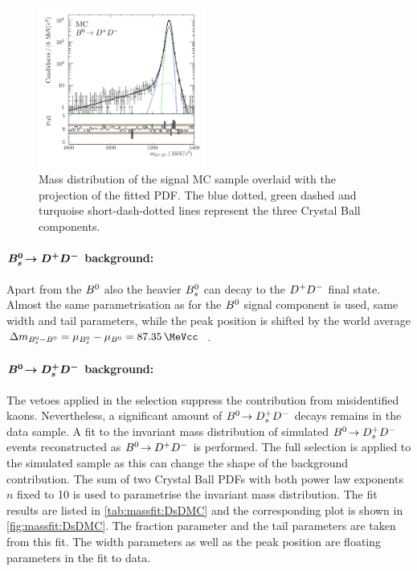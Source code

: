 \begin{figure}[tbh]
\centering
\includegraphics[width=0.49\textwidth]{07-B02DD/tikz/pdf/obsMass_MC.pdf}
\caption{Mass distribution of the \BdToDD signal MC sample overlaid with the
projection of the fitted PDF. The blue dotted, green dashed and turquoise
short-dash-dotted lines represent the three Crystal Ball components.}%
\label{fig:b02dd:massfit:mc}
\end{figure}

\paragraph{$\boldsymbol{{{B}^0_{s}}\!\rightarrow {\ensuremath{{D}^+}}{\ensuremath{{D}^-}}}$ background:}
Apart from the ${{B}^0}$ also the heavier ${{B}^0_{s}}$ can decay to the ${{D}^+}{{D}^-}$ final state.
Almost the same parametrisation as for the ${{B}^0}$ signal component is used, \ie
same width and tail parameters, while the peak position is shifted by the
world average $\dmBdBs = \mu_{\Bs} - \mu_{\Bd} =
\SI{87.35}{\MeVcc}$~\cite{PDG2014}.

\paragraph{$\boldsymbol{{{B}^0}\!\rightarrow {\ensuremath{{D}^+_{s}}}{\ensuremath{{D}^-}}}$ background:}
The vetoes applied in the selection suppress the contribution from
misidentified kaons. Nevertheless, a significant amount of \mbox{${{B}^0}\!\rightarrow {\ensuremath{{D}^+_{s}}}{\ensuremath{{D}^-}}$}
decays remains in the data sample. A fit to the invariant mass distribution of
simulated ${{B}^0}\!\rightarrow {\ensuremath{{D}^+_{s}}}{\ensuremath{{D}^-}}$ events reconstructed as ${{B}^0}\!\rightarrow {\ensuremath{{D}^+}}{\ensuremath{{D}^-}}$ is performed. The full
selection is applied to the simulated sample as this can change the shape of
the \BdToDsD background contribution. The sum of two Crystal Ball PDFs with
both power law exponents $n$ fixed to \num{10} is used to parametrise the
invariant mass distribution. The fit results are listed in
\cref{tab:massfit:DsDMC} and the corresponding plot is shown in
\cref{fig:massfit:DsDMC}. The fraction parameter and the tail parameters are
taken from this fit. The width parameters as well as the peak position are
floating parameters in the fit to data.


